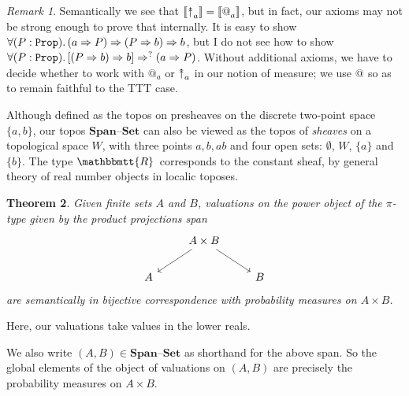 \documentclass[11pt, oneside, article]{memoir}
\makeatletter
\theoremstyle{plain}
\newtheorem{theorem}{Theorem}[chapter] %
\theoremstyle{definition}
\theoremstyle{remark}
\newtheorem{remark}[theorem]{Remark}
\DeclarePairedDelimiter{\church}{\llbracket}{\rrbracket}
\newcommand{\const}[1]{\mathtt{#1}}
\newcommand{\Cat}[1]{\mathbf{#1}}
\newcommand{\smset}{\Cat{Set}}
\newcommand{\internal}[1]{\raisebox{-.03ex}{$\mathbbmtt{#1}$}}
\newcommand{\hs}{\hspace{1.1pt}}
\newcommand{\tRR}{\internal{R}\hs}
\newcommand{\Prop}{\const{Prop}}
\newcommand{\AtSymbol}{{@}}
\newcommand{\InSymbol}{{\upclose}}%
\newcommand{\At}[2][]{\AtSymbol^{#1}_{#2}}
\newcommand{\In}[2][]{\InSymbol^{#1}_{#2}}
\newcommand{\upclose}{{\rotatebox[origin=c]{90}{$\twoheadrightarrow$}}}
\newcommand{\imp}{\Rightarrow}
\newcommand{\Span}{\Cat{Span}}
\newcommand{\set}{\text{--}\smset}
\makeatother
\begin{document}
\begin{remark}
Semantically we see that $\church{\In{a}}=\church{\At{a}}$, but in fact, our axioms may not be strong enough to prove that internally. It is easy to show $\forall(P:\Prop)\ldotp(a\imp P)\imp(P\imp b)\imp b$, but I do not see how to show $\forall(P:\Prop)\ldotp[(P\imp b)\imp b]\imp^? (a\imp P)$. Without additional axioms, we have to decide whether to work with $\At{a}$ or $\In{a}$ in our notion of measure; we use $\At{}$ so as to remain faithful to the TTT case. 
\end{remark}

Although defined as the topos on presheaves on the discrete two-point space $\{a,b\}$, our topos $\Span\set$ can also be viewed as the topos of \emph{sheaves} on a topological space $W$, with three points $a,b,ab$ and four open sets: $\emptyset$, $W$, $\{a\}$ and $\{b\}$. The type $\tRR$ corresponds to the constant sheaf, by general theory of real number objects in localic toposes.

\begin{theorem}
Given finite sets $A$ and $B$, valuations on the power object of the $\pi$-type given by the product projections span
\[\begin{tikzcd}
	& A \times B \ar{dl} \ar{dr} \\
	A & & B
\end{tikzcd}\]
are semantically in bijective correspondence with probability measures on $A\times B$.
\end{theorem}

Here, our valuations take values in the lower reals.

We also write $(A,B)\in\Span\set$ as shorthand for the above span. So the global elements of the object of valuations on $(A,B)$ are precisely the probability measures on $A\times B$.
\end{document}
